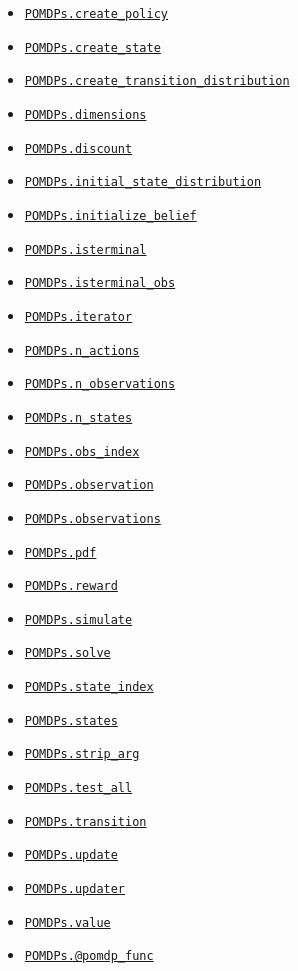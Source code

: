 \documentclass[12pt,]{article}
\begin{document}
\begin{itemize}
\item
  \href{api.md\#POMDPs.create_policy}{\texttt{POMDPs.create\_policy}}
\item
  \href{api.md\#POMDPs.create_state}{\texttt{POMDPs.create\_state}}
\item
  \href{api.md\#POMDPs.create_transition_distribution}{\texttt{POMDPs.create\_transition\_distribution}}
\item
  \href{api.md\#POMDPs.dimensions}{\texttt{POMDPs.dimensions}}
\item
  \href{api.md\#POMDPs.discount}{\texttt{POMDPs.discount}}
\item
  \href{api.md\#POMDPs.initial_state_distribution}{\texttt{POMDPs.initial\_state\_distribution}}
\item
  \href{api.md\#POMDPs.initialize_belief}{\texttt{POMDPs.initialize\_belief}}
\item
  \href{api.md\#POMDPs.isterminal}{\texttt{POMDPs.isterminal}}
\item
  \href{api.md\#POMDPs.isterminal_obs}{\texttt{POMDPs.isterminal\_obs}}
\item
  \href{api.md\#POMDPs.iterator}{\texttt{POMDPs.iterator}}
\item
  \href{api.md\#POMDPs.n_actions}{\texttt{POMDPs.n\_actions}}
\item
  \href{api.md\#POMDPs.n_observations}{\texttt{POMDPs.n\_observations}}
\item
  \href{api.md\#POMDPs.n_states}{\texttt{POMDPs.n\_states}}
\item
  \href{api.md\#POMDPs.obs_index}{\texttt{POMDPs.obs\_index}}
\item
  \href{api.md\#POMDPs.observation}{\texttt{POMDPs.observation}}
\item
  \href{api.md\#POMDPs.observations}{\texttt{POMDPs.observations}}
\item
  \href{api.md\#POMDPs.pdf}{\texttt{POMDPs.pdf}}
\item
  \href{api.md\#POMDPs.reward}{\texttt{POMDPs.reward}}
\item
  \href{api.md\#POMDPs.simulate}{\texttt{POMDPs.simulate}}
\item
  \href{api.md\#POMDPs.solve}{\texttt{POMDPs.solve}}
\item
  \href{api.md\#POMDPs.state_index}{\texttt{POMDPs.state\_index}}
\item
  \href{api.md\#POMDPs.states}{\texttt{POMDPs.states}}
\item
  \href{api.md\#POMDPs.strip_arg}{\texttt{POMDPs.strip\_arg}}
\item
  \href{api.md\#POMDPs.test_all}{\texttt{POMDPs.test\_all}}
\item
  \href{api.md\#POMDPs.transition}{\texttt{POMDPs.transition}}
\item
  \href{api.md\#POMDPs.update}{\texttt{POMDPs.update}}
\item
  \href{api.md\#POMDPs.updater}{\texttt{POMDPs.updater}}
\item
  \href{api.md\#POMDPs.value}{\texttt{POMDPs.value}}
\item
  \href{api.md\#POMDPs.@pomdp_func}{\texttt{POMDPs.@pomdp\_func}}
\end{itemize}
\end{document}
